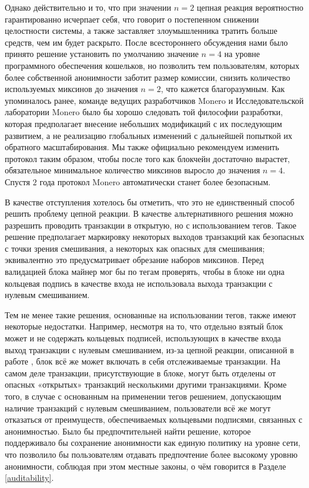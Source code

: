 \documentclass{mrl}
\begin{document}
Однако действительно и то, что при значении $n=2$ цепная реакция вероятностно гарантированно исчерпает себя, что говорит о постепенном снижении целостности системы, а также заставляет злоумышленника тратить больше средств, чем им будет раскрыто. После всестороннего обсуждения нами было принято решение установить по умолчанию значение $n=4$ на уровне программного обеспечения кошельков, но позволить тем пользователям, которых более собственной анонимности заботит размер комиссии, снизить количество используемых миксинов до значения $n=2$, что кажется благоразумным. Как упоминалось ранее, команде ведущих разработчиков Monero и Исследовательской лаборатории Monero было бы хорошо следовать той философии разработки, которая предполагает внесение небольших модификаций с их последующим развитием, а не реализацию глобальных изменений с дальнейшей попыткой их обратного масштабирования. Мы также официально рекомендуем изменить протокол таким образом, чтобы после того как блокчейн достаточно вырастет, обязательное минимальное количество миксинов выросло до значения $n=4$. Спустя $2$ года протокол Monero автоматически станет более безопасным.

В качестве отступления хотелось бы отметить, что это не единственный способ решить проблему цепной реакции. В качестве альтернативного решения можно разрешить проводить транзакции в открытую, но с использованием тегов. Такое решение предполагает маркировку некоторых выходов транзакций как безопасных с точки зрения смешивания, а некоторых как опасных для смешивания; эквивалентно это предусматривает обрезание наборов миксинов. Перед валидацией блока майнер мог бы по тегам проверять, чтобы в блоке ни одна кольцевая подпись в качестве входа не использовала выхода транзакции с нулевым смешиванием.

Тем не менее такие решения, основанные на использовании тегов, также имеют некоторые недостатки. Например, несмотря на то, что отдельно взятый блок может и не содержать кольцевых подписей, использующих в качестве входа выход транзакции с нулевым смешиванием, из-за цепной реакции, описанной в работе \cite{chainReactions}, блок всё же может включать в себя отслеживаемые транзакции. На самом деле транзакции, присутствующие в блоке, могут быть отделены от опасных «открытых» транзакций несколькими другими транзакциями. Кроме того, в случае с основанным на применении тегов решением, допускающим наличие транзакций с нулевым смешиванием, пользователи всё же могут отказаться от преимуществ, обеспечиваемых кольцевыми подписями, связанных с анонимностью. Было бы предпочтительней найти решение, которое поддерживало бы сохранение анонимности как единую политику на уровне сети, что позволило бы пользователям отдавать предпочтение более высокому уровню анонимности, соблюдая при этом местные законы, о чём говорится в Разделе \ref{auditability}.
\end{document}
